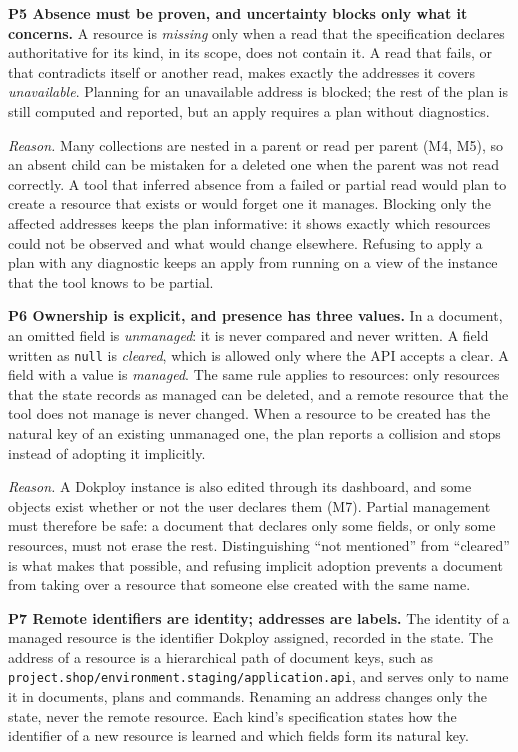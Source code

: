 \textbf{P5 Absence must be proven, and uncertainty blocks only what it concerns.} A resource is \emph{missing}
only when a read that the specification declares authoritative for its kind, in its scope, does not
contain it. A read that fails, or that contradicts itself or another read, makes exactly the addresses
it covers \emph{unavailable}. Planning for an unavailable address is blocked; the rest of the plan is
still computed and reported, but an apply requires a plan without diagnostics.

\emph{Reason.} Many collections are nested in a parent or read per parent (M4, M5), so an absent child can
be mistaken for a deleted one when the parent was not read correctly. A tool that inferred absence
from a failed or partial read would plan to create a resource that exists or would forget one it
manages. Blocking only the affected addresses keeps the plan informative: it shows exactly which
resources could not be observed and what would change elsewhere. Refusing to apply a plan with any
diagnostic keeps an apply from running on a view of the instance that the tool knows to be partial.

\textbf{P6 Ownership is explicit, and presence has three values.} In a document, an omitted field is
\emph{unmanaged}: it is never compared and never written. A field written as \texttt{null} is \emph{cleared}, which is
allowed only where the API accepts a clear. A field with a value is \emph{managed}. The same rule applies to
resources: only resources that the state records as managed can be deleted, and a remote resource
that the tool does not manage is never changed. When a resource to be created has the natural key of
an existing unmanaged one, the plan reports a collision and stops instead of adopting it implicitly.

\emph{Reason.} A Dokploy instance is also edited through its dashboard, and some objects exist whether or
not the user declares them (M7). Partial management must therefore be safe: a document that declares
only some fields, or only some resources, must not erase the rest. Distinguishing ``not mentioned''
from ``cleared'' is what makes that possible, and refusing implicit adoption prevents a document from
taking over a resource that someone else created with the same name.

\textbf{P7 Remote identifiers are identity; addresses are labels.} The identity of a managed resource is
the identifier Dokploy assigned, recorded in the state. The address of a resource is a hierarchical
path of document keys, such as \texttt{project.shop/environment.staging/application.api}, and serves only to
name it in documents, plans and commands. Renaming an address changes only the state, never the remote
resource. Each kind's specification states how the identifier of a new resource is learned and which
fields form its natural key.

